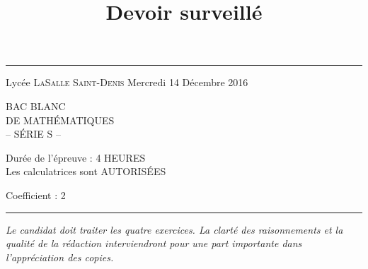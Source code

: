 \documentclass[12pt,a4paper,french]{article}
\title{Devoir surveillé \no{1}}
\def\coeff{2}
\begin{document}
\thispagestyle{empty}

\vspace*{1cm}

\begin{center}
\bfseries \large%
\rule{\textwidth}{1pt}

Lycée \textsc{La\!Salle Saint-Denis} \hfill
Mercredi 14 Décembre 2016

{\Huge%
\setlength{\baselineskip}{\coeff\baselineskip}%
BAC BLANC \\
DE MATHÉMATIQUES\\
-- SÉRIE S --\\}

\vspace{\coeff\baselineskip}

Durée de l'épreuve : 4 HEURES\\
Les calculatrices sont AUTORISÉES\\

\vspace{\coeff\baselineskip}


\hfill Coefficient : \coeff\\


\rule{\textwidth}{1pt}

\vspace{0.5cm}

\begin{minipage}{0.8\textwidth}
\normalsize \normalfont \slshape
Le candidat doit traiter les quatre  exercices.
La clarté des raisonnements et la qualité de la
rédaction interviendront pour une part importante
dans l'appréciation des copies.
\end{minipage}%

\vspace*{0.5cm}

\end{center}


\pagebreak

\begin{question}
  
\end{question}
\end{document}
